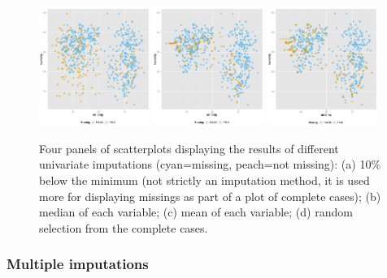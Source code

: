 \documentclass[article]{jss}
\begin{document}
\begin{center}
\begin{figure}[h]
\begin{centering}
\includegraphics[width=0.32\textwidth]{graph/fig3-4-random}
\includegraphics[width=0.32\textwidth]{graph/fig3-5-knn}
\includegraphics[width=0.32\textwidth]{graph/fig3-5-knn-2}
\par\end{centering}

\caption{Four panels of scatterplots displaying the results of different univariate imputations (cyan=missing, peach=not missing): (a) 10\% below the minimum (not strictly an imputation method, it is used more for displaying missings as part of a plot of complete cases); (b) median of each variable; (c) mean of each variable; (d) random selection from the complete cases. }
\end{figure}
\label{fig:univariate-imputation}
\par\end{center}

\subsubsection{Multiple imputations}
\end{document}
